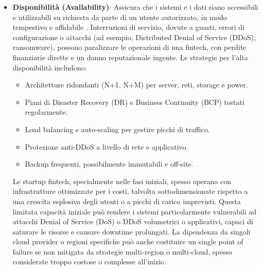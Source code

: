 \begin{itemize}
\begin{itemize}
\item Firme digitali (basate su Public Key Infrastructure, PKI) per l'autenticazione dell'origine e l'integrità dei messaggi.
\item Sistemi di controllo versione (ad esempio, Git con commit firmati) per codice e configurazioni.
\item Checksum e meccanismi di error detection/correction in storage e trasmissione.
\item Log di audit immutabili.
\end{itemize}
Per una startup fintech, compromettere l'integrità dei dati transazionali o dei saldi dei clienti ha conseguenze catastrofiche, erodendo istantaneamente la fiducia e la brand reputation, oltre a potenziali implicazioni legali e sanzionatorie. La pressione per rilasci software frequenti, attraverso metodologie di Continuous Integration/Continuous Deployment (CI/CD), può portare a cicli di testing affrettati, aumentando il rischio di bug che potrebbero corrompere i dati. Inoltre, l'integrazione con numerose Application Programming Interface (API) di terze parti (ad esempio, per Know Your Customer/Anti-Money Laundering (KYC/AML), open banking, payment gateway) introduce dipendenze la cui affidabilità in termini di integrità dei dati scambiati deve essere costantemente monitorata.
\item \textbf{Disponibilità (Availability)}: Assicura che i sistemi e i dati siano accessibili e utilizzabili su richiesta da parte di un utente autorizzato, in modo tempestivo e affidabile \cite{NIST_SP_1800_26}. Interruzioni di servizio, dovute a guasti, errori di configurazione o attacchi (ad esempio, Distributed Denial of Service (DDoS), ransomware), possono paralizzare le operazioni di una fintech, con perdite finanziarie dirette e un danno reputazionale ingente. Le strategie per l'alta disponibilità includono:
\begin{itemize}
\item Architetture ridondanti (N+1, N+M) per server, reti, storage e power.
\item Piani di Disaster Recovery (DR) e Business Continuity (BCP) testati regolarmente.
\item Load balancing e auto-scaling per gestire picchi di traffico.
\item Protezione anti-DDoS a livello di rete e applicativo.
\item Backup frequenti, possibilmente immutabili e off-site.
\end{itemize}
Le startup fintech, specialmente nelle fasi iniziali, spesso operano con infrastrutture ottimizzate per i costi, talvolta sottodimensionate rispetto a una crescita esplosiva degli utenti o a picchi di carico imprevisti. Questa limitata capacità iniziale può rendere i sistemi particolarmente vulnerabili ad attacchi Denial of Service (DoS) o DDoS volumetrici o applicativi, capaci di saturare le risorse e causare downtime prolungati. La dipendenza da singoli cloud provider o regioni specifiche può anche costituire un single point of failure se non mitigata da strategie multi-region o multi-cloud, spesso considerate troppo costose o complesse all'inizio.
\end{itemize}
